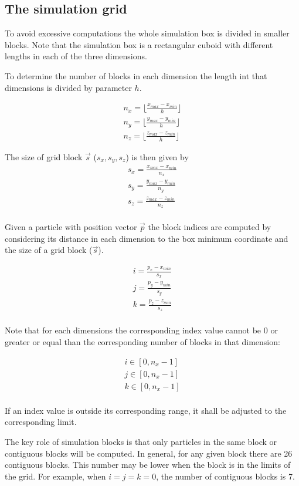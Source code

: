 \subsection{The simulation grid}

To avoid excessive computations the whole simulation box is divided in smaller
blocks. Note that the simulation box is a rectangular cuboid with different
lengths in each of the three dimensions. 

To determine the number of blocks in each dimension the length int that
dimensions is divided by parameter $h$.

\[
\begin{split}
n_x = \lfloor \frac{x_{max}- x_{min}}{h} \rfloor\\
n_y = \lfloor \frac{y_{max}- y_{min}}{h} \rfloor\\
n_z = \lfloor \frac{z_{max}- z_{min}}{h} \rfloor
\end{split}
\]

The size of grid block $\vec{s}$ ($s_x, s_y, s_z$) is then given by
\[
\begin{split}
s_x = \frac{x_{max} - x_{min}}{n_x}\\
s_y = \frac{y_{max} - y_{min}}{n_y}\\
s_z = \frac{z_{max} - z_{min}}{n_z}\\
\end{split}
\] 

Given a particle with position vector $\vec{p}$ the block indices are computed
by considering its distance in each dimension to the box minimum coordinate
and the size of a grid block ($\vec{s}$).

\[
\begin{split}
i = \frac{p_x - x_{min}}{s_x}\\
j = \frac{p_y - y_{min}}{s_y}\\
k = \frac{p_z - z_{min}}{s_z}\\
\end{split}
\]

Note that for each dimensions the corresponding index value cannot be $0$ or
greater or equal than the corresponding number of blocks in that dimension:

\[
\begin{split}
i \in [0, n_x-1]\\
j \in [0, n_x-1]\\
k \in [0, n_x-1]\\
\end{split}
\]

If an index value is outside its corresponding range, it shall be adjusted to
the corresponding limit.

The key role of simulation blocks is that only particles in the same block or
contiguous blocks will be computed. In general, for any given block there are
26 contiguous blocks. This number may be lower when the block is in the limits
of the grid. For example, when $i=j=k=0$, the number of contiguous blocks is 7.
